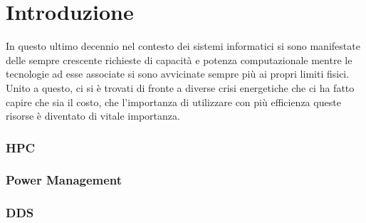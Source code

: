 \chapter{Introduzione}
In questo ultimo decennio nel contesto dei sistemi informatici si sono manifestate delle sempre crescente richieste di capacità e potenza computazionale mentre le tecnologie ad esse associate si sono avvicinate sempre più ai propri limiti fisici. 
Unito a questo, ci si è trovati di fronte a diverse crisi energetiche che ci ha fatto capire che sia il costo, che l'importanza di utilizzare con più efficienza queste risorse è diventato di vitale importanza.
\subsection{HPC}
\subsection{Power Management}
\subsection{DDS}



